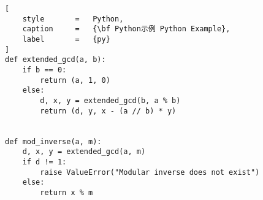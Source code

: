 \begin{lstlisting}[
    style       =   Python,
    caption     =   {\bf Python示例 Python Example},
    label       =   {py}
]
def extended_gcd(a, b):
    if b == 0:
        return (a, 1, 0)
    else:
        d, x, y = extended_gcd(b, a % b)
        return (d, y, x - (a // b) * y)


def mod_inverse(a, m):
    d, x, y = extended_gcd(a, m)
    if d != 1:
        raise ValueError("Modular inverse does not exist")
    else:
        return x % m
\end{lstlisting} %
